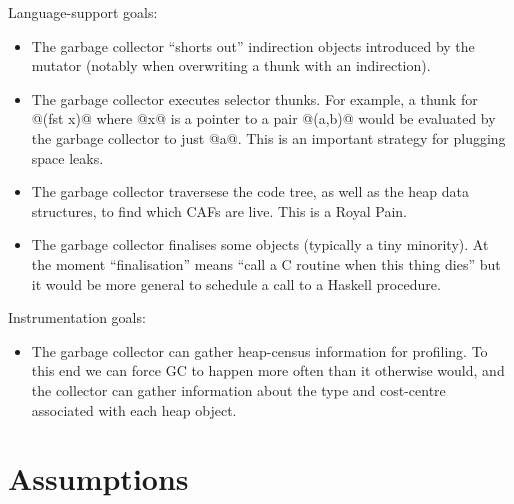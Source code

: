\documentclass{article}
\begin{document}
Language-support goals:
\begin{itemize}
\item The garbage collector ``shorts out'' indirection objects introduced
by the mutator (notably when overwriting a thunk with an indirection).

\item The garbage collector executes selector thunks.  
For example, a thunk for
@(fst x)@ where @x@ is a pointer to a pair @(a,b)@ would be
evaluated by the garbage collector to just @a@.  This is an important
strategy for plugging space leaks.

\item The garbage collector traversese the code tree, as well as
the heap data structures, to find which CAFs are live.  This is a Royal Pain.

\item The garbage collector finalises some objects (typically a tiny minority).
At the moment ``finalisation'' means ``call a C routine when this thing
dies'' but it would be more general to schedule a call to a Haskell 
procedure.
\end{itemize}

Instrumentation goals:

\begin{itemize}
\item The garbage collector can gather heap-census information for profiling.
To this end we can force GC to happen more often than it otherwise would,
and the collector can gather information about the type and cost-centre
associated with each heap object.
\end{itemize}


\section{Assumptions}
\end{document}
